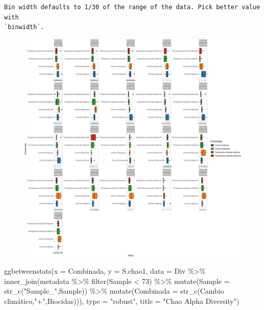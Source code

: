 \documentclass[
  letterpaper,
  DIV=11,
  numbers=noendperiod]{scrartcl}
\newenvironment{Shaded}{\begin{snugshade}}{\end{snugshade}}
\newcommand{\AttributeTok}[1]{\textcolor[rgb]{0.40,0.45,0.13}{#1}}
\newcommand{\DecValTok}[1]{\textcolor[rgb]{0.68,0.00,0.00}{#1}}
\newcommand{\FunctionTok}[1]{\textcolor[rgb]{0.28,0.35,0.67}{#1}}
\newcommand{\NormalTok}[1]{\textcolor[rgb]{0.00,0.23,0.31}{#1}}
\newcommand{\SpecialCharTok}[1]{\textcolor[rgb]{0.37,0.37,0.37}{#1}}
\newcommand{\StringTok}[1]{\textcolor[rgb]{0.13,0.47,0.30}{#1}}
\begin{document}
\begin{verbatim}
Bin width defaults to 1/30 of the range of the data. Pick better value with
`binwidth`.
\end{verbatim}

\begin{figure}[H]

{\centering \includegraphics{InformeNeiker_files/figure-pdf/unnamed-chunk-7-5.pdf}

}

\end{figure}

\begin{Shaded}
\begin{Highlighting}[]
\FunctionTok{ggbetweenstats}\NormalTok{(}\AttributeTok{x =}\NormalTok{ Combinada,}
               \AttributeTok{y =}\NormalTok{ S.chao1, }
               \AttributeTok{data =}\NormalTok{ Div }\SpecialCharTok{\%\textgreater{}\%} \FunctionTok{inner\_join}\NormalTok{(metadata }\SpecialCharTok{\%\textgreater{}\%}                                                                       \FunctionTok{filter}\NormalTok{(Sample }\SpecialCharTok{\textless{}} \DecValTok{73}\NormalTok{) }\SpecialCharTok{\%\textgreater{}\%} 
                                \FunctionTok{mutate}\NormalTok{(}\AttributeTok{Sample =} \FunctionTok{str\_c}\NormalTok{(}\StringTok{"Sample\_"}\NormalTok{,Sample)) }\SpecialCharTok{\%\textgreater{}\%} 
                                \FunctionTok{mutate}\NormalTok{(}\AttributeTok{Combinada =} \FunctionTok{str\_c}\NormalTok{(}\StringTok{\textasciigrave{}}\AttributeTok{Cambio climático}\StringTok{\textasciigrave{}}\NormalTok{,}\StringTok{"+"}\NormalTok{,Biocidas))),}
               \AttributeTok{type =} \StringTok{"robust"}\NormalTok{, }\AttributeTok{title =} \StringTok{"Chao Alpha Diversity"}\NormalTok{)}
\end{Highlighting}
\end{Shaded}
\end{document}
